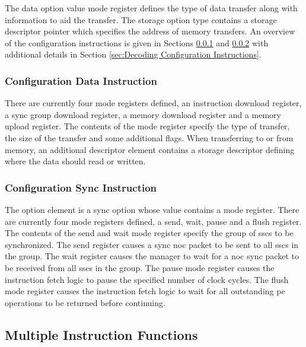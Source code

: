 The data option value mode register \cite{standard2007jedec} defines the type of data transfer along with information to aid the transfer. 
The storage option type contains a storage descriptor pointer which specifies the address of memory transfers.
An overview of the configuration instructions is given in Sections \ref{sec:Data Transfer Instruction} and \ref{sec:Sync Instruction} with additional details in Section \ref{sec:Decoding Configuration Instructions}.

\subsubsection{Configuration Data Instruction}
\label{sec:Data Transfer Instruction}

There are currently four mode registers defined, an instruction download register, a sync group download register, a memory download register and a memory upload register.
The contents of the mode register specify the type of transfer, the size of the transfer and some additional flags.
When transferring to or from memory, an additional descriptor element contains a storage descriptor defining where the data should read or written.

\subsubsection{Configuration Sync Instruction}
\label{sec:Sync Instruction}

The option element is a sync option whose value contains a mode register.
There are currently four mode registers defined, a send, wait, pause and a flush register.
The contents of the send and wait mode register specify the group of \acp{ssc} to be synchronized. 
The send register causes a sync \ac{noc} packet to be sent to all \acp{ssc} in the group.
The wait register causes the manager to wait for a \ac{noc} sync packet to be received from all \acp{ssc} in the group.
The pause mode register causes the instruction fetch logic to pause the specified number of clock cycles.
The flush mode register causes the instruction fetch logic to wait for all outstanding \ac{pe} operations to be returned before continuing.

\subsection{Multiple Instruction Functions}
\label{sec:Multiple Instruction Functions}

